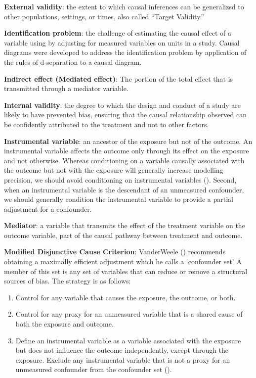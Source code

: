 \documentclass[
  singlecolumn]{article}
\providecommand{\tightlist}{%
  \setlength{\itemsep}{0pt}\setlength{\parskip}{0pt}}\usepackage{longtable,booktabs,array}
\begin{document}
\textbf{External validity}: the extent to which causal inferences can be
generalizsd to other populations, settings, or times, also called
``Target Validity.''

\textbf{Identification problem}: the challenge of estimating the causal
effect of a variable using by adjusting for measured variables on units
in a study. Causal diagrams were developed to address the identification
problem by application of the rules of d-separation to a causal diagram.

\textbf{Indirect effect (Mediated effect)}: The portion of the total
effect that is transmitted through a mediator variable.

\textbf{Internal validity}: the degree to which the design and conduct
of a study are likely to have prevented bias, ensuring that the causal
relationship observed can be confidently attributed to the treatment and
not to other factors.

\textbf{Instrumental variable}: an ancestor of the exposure but not of
the outcome. An instrumental variable affects the outcome only through
its effect on the exposure and not otherwise. Whereas conditioning on a
variable causally associated with the outcome but not with the exposure
will generally increase modelling precision, we should avoid
conditioning on instrumental variables
(). Second, when
an instrumental variable is the descendant of an unmeasured confounder,
we should generally condition the instrumental variable to provide a
partial adjustment for a confounder.

\textbf{Mediator}: a variable that transmits the effect of the treatment
variable on the outcome variable, part of the causal pathway between
treatment and outcome.

\textbf{Modified Disjunctive Cause Criterion}: VanderWeele
() recommends obtaining a maximally
efficient adjustment which he calls a `confounder set' A member of this
set is any set of variables that can reduce or remove a structural
sources of bias. The strategy is as follows:

\begin{enumerate}
\def\labelenumi{\alph{enumi}.}
\tightlist
\item
  Control for any variable that causes the exposure, the outcome, or
  both.
\item
  Control for any proxy for an unmeasured variable that is a shared
  cause of both the exposure and outcome.
\item
  Define an instrumental variable as a variable associated with the
  exposure but does not influence the outcome independently, except
  through the exposure. Exclude any instrumental variable that is not a
  proxy for an unmeasured confounder from the confounder set
  ().
\end{enumerate}
\end{document}
